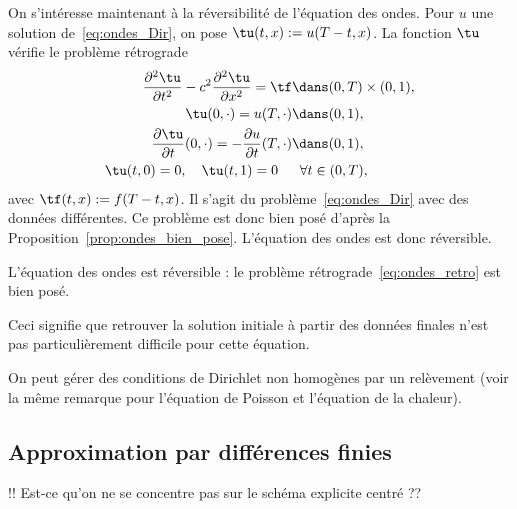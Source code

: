 \documentclass[12pt,a4paper,twoside]{article}
\begin{document}
On s'int\'eresse maintenant \`a la r\'eversibilit\'e de l'\'equation des ondes.
Pour $u$ une solution de~\eqref{eq:ondes_Dir}, on pose $\tu(t,x) := u(T-t, x)$.
La fonction $\tu$ v\'erifie le probl\`eme r\'etrograde
\begin{align}
  \nonumber
  \dfrac{\partial^2 \tu}{\partial t^2} - c^2 \dfrac{\partial^2 \tu}{\partial x^2} = \tf 
  &\dans (0,T) \times (0,1) ,
  \\
  \label{eq:ondes_retro}
  \tu(0,\cdot) = u(T,\cdot) 
  & \dans (0,1) ,
  \\
  \nonumber
  \dfrac{\partial \tu}{\partial t}(0,\cdot) = - \dfrac{\partial u}{\partial t}(T,\cdot) 
  & \dans (0,1) ,
  \\
  \nonumber
  \tu(t,0) = 0 , \quad \tu(t,1) = 0 
  \quad& \;\; \forall t \in (0,T) ,
\end{align}
avec $\tf(t,x) := f(T-t, x)$.
Il s'agit du probl\`eme~\eqref{eq:ondes_Dir} avec des donn\'ees diff\'erentes.
Ce probl\`eme est donc bien pos\'e d'apr\`es la Proposition~\ref{prop:ondes_bien_pose}.
L'\'equation des ondes est donc r\'eversible.

\begin{proposition}
  L'\'equation des ondes est r\'eversible : le probl\`eme r\'etrograde~\eqref{eq:ondes_retro}
  est bien pos\'e.
\end{proposition}
Ceci signifie que retrouver la solution initiale \`a partir des donn\'ees
finales n'est pas particuli\`erement difficile pour cette \'equation.


\begin{remark}
  On peut g\'erer des conditions de Dirichlet non homog\`enes par un rel\`evement
  (voir la m\^eme remarque pour l'\'equation de Poisson et l'\'equation de la chaleur).
\end{remark}

\subsection{Approximation par diff\'erences finies}

!! Est-ce qu'on ne se concentre pas sur le sch\'ema explicite centr\'e ??
\end{document}

